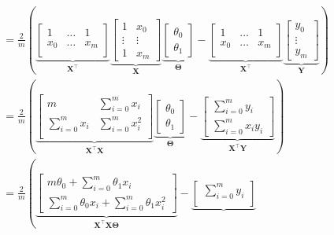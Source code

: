 \documentclass[12pt,initial,twoside,maitrise]{dms}
\numberwithin{equation}{section}
\numberwithin{table}{chapter}
\numberwithin{figure}{chapter}
\begin{document}
\begin{align}
& = \frac{2}{m}\left(
\underbrace{\begin{bmatrix}
1 & \ldots & 1 \\
x_0 & \ldots & x_m \\
\end{bmatrix}}_{\mathbf{X}^\intercal}
\underbrace{\begin{bmatrix}
1 & x_0 \\
\vdots & \vdots \\
1 & x_m
\end{bmatrix}}_{\mathbf{X}}
\underbrace{\begin{bmatrix}
\theta_0 \\
\theta_1
\end{bmatrix}}_{\mathbf{\Theta}} -
\underbrace{\begin{bmatrix}
1 & \ldots & 1 \\
x_0 & \ldots & x_m \\
\end{bmatrix}}_{\mathbf{X}^\intercal}
\underbrace{\begin{bmatrix}
y_0 \\
\vdots \\
y_m
\end{bmatrix}}_{\mathbf{Y}}\right) \\
& = \frac{2}{m}\left(
\underbrace{\begin{bmatrix}
m & \sum_{i=0}^{m}x_i \\
\sum_{i=0}^{m}x_i & \sum_{i=0}^{m}x_i^2 \\
\end{bmatrix}}_{\mathbf{X}^\intercal\mathbf{X}}
\underbrace{\begin{bmatrix}
\theta_0 \\
\theta_1
\end{bmatrix}}_{\mathbf{\Theta}} -
\underbrace{\begin{bmatrix}
\sum_{i=0}^{m}y_i \\
\sum_{i=0}^{m}x_iy_i
\end{bmatrix}}_{\mathbf{X}^\intercal\mathbf{Y}}\right) \\
& = \frac{2}{m}\left(
\underbrace{\begin{bmatrix}
m \theta_0 + \sum_{i=0}^{m}\theta_1x_i \\
\sum_{i=0}^{m}\theta_0x_i + \sum_{i=0}^{m}\theta_1x_i^2
\end{bmatrix}}_{\mathbf{X}^\intercal\mathbf{X}\mathbf{\Theta}} -
\underbrace{\begin{bmatrix}
\sum_{i=0}^{m}y_i \\

\end{bmatrix}}
\end{align}
\end{document}
